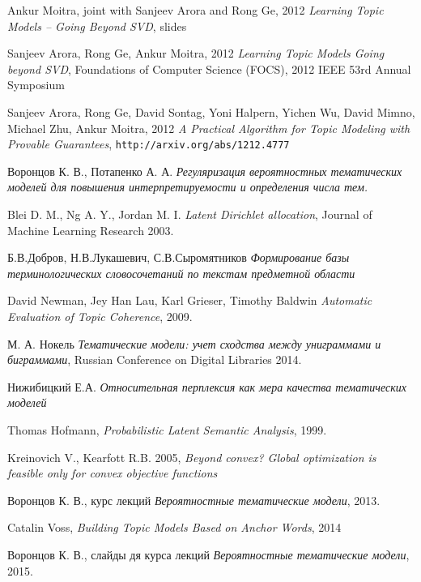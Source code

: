 \documentclass[a4paper, 14pt]{extarticle}
\begin{document}
\newpage
\begin{thebibliography}{100} 

\addtolength{\leftmargin}{0.6in} \setlength{\itemindent}{-0.0in}

 Ankur Moitra, joint with Sanjeev Arora and Rong Ge, 2012 {\it Learning Topic Models -- Going Beyond SVD}, slides

 Sanjeev Arora, Rong Ge, Ankur Moitra, 2012 {\it Learning Topic Models Going beyond SVD}, Foundations of
Computer Science (FOCS), 2012 IEEE 53rd Annual Symposium

 Sanjeev Arora, Rong Ge, David Sontag, Yoni Halpern, Yichen Wu, David Mimno, Michael Zhu, Ankur Moitra, 2012 {\it  A Practical Algorithm for Topic Modeling with Provable Guarantees}, \texttt{http://arxiv.org/abs/1212.4777} 

 Воронцов К. В., Потапенко А. А. \textit{Регуляризация вероятностных тематических моделей для повышения интерпретируемости и определения числа тем.}

 Blei D. M., Ng A. Y., Jordan M. I. \textit{Latent Dirichlet allocation}, Journal of Machine Learning Research 2003.

 Б.В.Добров, Н.В.Лукашевич, С.В.Сыромятников \emph{Формирование базы терминологических словосочетаний по текстам предметной области} 

 David Newman, Jey Han Lau, Karl Grieser, Timothy Baldwin \textit{Automatic Evaluation of Topic Coherence}, 2009.

 М. А. Нокель \textit{Тематические модели: учет сходства между униграммами и биграммами}, Russian Conference on Digital Libraries 2014.

 Нижибицкий Е.А. \textit{Относительная перплексия как мера качества тематических моделей}

 Thomas Hofmann, \textit{Probabilistic Latent Semantic Analysis}, 1999.

 Kreinovich V., Kearfott R.B. 2005, {\it Beyond convex? Global optimization is feasible only for convex objective functions}

 Воронцов К. В., курс лекций \textit{Вероятностные тематические модели}, 2013.

 Catalin Voss, {\it Building Topic Models Based on Anchor Words}, 2014

 Воронцов К. В., слайды дя курса лекций \textit{Вероятностные тематические модели}, 2015.
\end{thebibliography}
\end{document}
